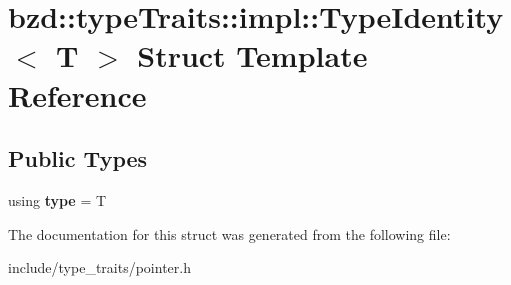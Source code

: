 \hypertarget{structbzd_1_1typeTraits_1_1impl_1_1TypeIdentity}{}\section{bzd\+:\+:type\+Traits\+:\+:impl\+:\+:Type\+Identity$<$ T $>$ Struct Template Reference}
\label{structbzd_1_1typeTraits_1_1impl_1_1TypeIdentity}
\subsection*{Public Types}
\begin{DoxyCompactItemize}
\item 
\mbox{\label{structbzd_1_1typeTraits_1_1impl_1_1TypeIdentity_a3280724a410b30b70303d27c1b0316bf}} 
using {\bfseries type} = T
\end{DoxyCompactItemize}


The documentation for this struct was generated from the following file\+:\begin{DoxyCompactItemize}
\item 
include/type\+\_\+traits/pointer.\+h\end{DoxyCompactItemize}
